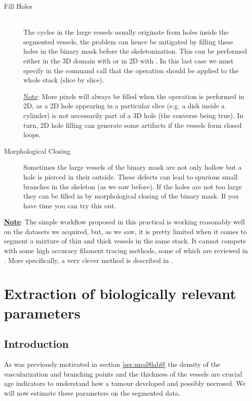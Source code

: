 \begin{description}
\item[Fill Holes]\hfill\\
The cycles in the large vessels usually originate from holes inside the segmented vessels, the problem can hence be mitigated by filling these holes in the binary mask before the skeletonization. This can be performed either in the 3D domain with  or in 2D with . In this last case we must specify in the command call that the operation should be applied to the whole stack (slice by slice). 

\underline{Note}:
More pixels will always be filled when the operation is performed in 2D, as a 2D hole appearing in a particular slice (e.g. a disk inside a cylinder) is not necessarily part of a 3D hole (the converse being true). In turn, 2D hole filling can generate some artifacts if the vessels form closed loops. 

\item[Morphological Closing] Sometimes the large vessels of the binary mask are not only hollow but a hole is pierced in their outside. These defects can lead to spurious small branches in the skeleton (as we saw before). If the holes are not too large they can be filled in by morphological closing of the binary mask. If you have time you can try this out.
%
\end{description}

\textbf{\underline{Note}}: The simple workflow proposed in this practical is working reasonably well on the datasets we acquired, but, as we saw, it is pretty limited when it comes to segment a mixture of thin and thick vessels in the same stack. It cannot compete with some high accuracy filament tracing methods, some of which are reviewed in \cite{lesage2009review}. More specifically, a very clever method is described in \cite{li2006vessels}. 

%

\section{Extraction of biologically relevant parameters}
%
\subsection{Introduction}
As was previously motivated in section \ref{sec:mod8lab0} the density of the vascularization and branching points and the thickness of the vessels are crucial age indicators to understand how a tumour developed and possibly necrosed. We will now estimate these parameters on the segmented data.
%
